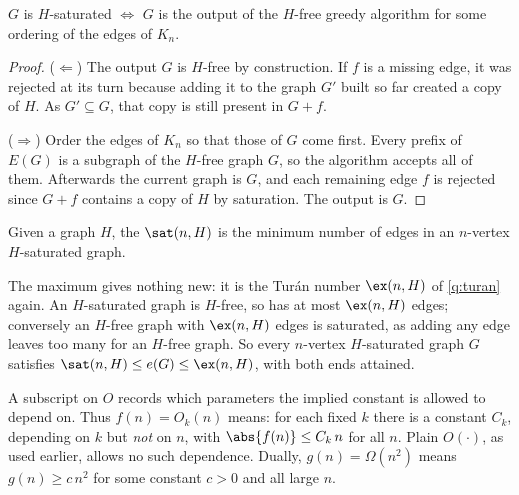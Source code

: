 \begin{observation}
    \(G\) is \(H\)-saturated \(\iff\) \(G\) is the output of the \(H\)-free greedy algorithm for some ordering of the edges of \(K_n\).
\end{observation}

\begin{proof}
    (\(\Leftarrow\)) The output \(G\) is \(H\)-free by construction. If \(f\) is a missing edge, it was rejected at its turn because adding it to the graph \(G'\) built so far created a copy of \(H\). As \(G' \subseteq G\), that copy is still present in \(G + f\).

    (\(\Rightarrow\)) Order the edges of \(K_n\) so that those of \(G\) come first. Every prefix of \(E(G)\) is a subgraph of the \(H\)-free graph \(G\), so the algorithm accepts all of them. Afterwards the current graph is \(G\), and each remaining edge \(f\) is rejected since \(G + f\) contains a copy of \(H\) by saturation. The output is \(G\).
\end{proof}

\begin{definition}
    Given a graph \(H\), the  \(\sat(n, H)\) is the minimum number of edges in an \(n\)-vertex \(H\)-saturated graph.
\end{definition}

\begin{remark}
    The maximum gives nothing new: it is the Tur\'an number \(\ex(n,H)\) of \autoref{q:turan} again. An \(H\)-saturated graph is \(H\)-free, so has at most \(\ex(n,H)\) edges; conversely an \(H\)-free graph with \(\ex(n,H)\) edges is saturated, as adding any edge leaves too many for an \(H\)-free graph. So every \(n\)-vertex \(H\)-saturated graph \(G\) satisfies \(\sat(n,H) \le e(G) \le \ex(n,H)\), with both ends attained.
\end{remark}

\begin{notation}[Subscripted \(O\)]\label{not:O-subscript}
    A subscript on \(O\) records which parameters the implied constant is allowed to depend on. Thus \(f(n) = O_k(n)\) means: for each fixed \(k\) there is a constant \(C_k\), depending on \(k\) but \emph{not} on \(n\), with \(\abs{f(n)} \le C_k \, n\) for all \(n\). Plain \(O(\cdot)\), as used earlier, allows no such dependence. Dually, \(g(n) = \Omega(n^2)\) means \(g(n) \ge c \, n^2\) for some constant \(c > 0\) and all large \(n\).
\end{notation}

